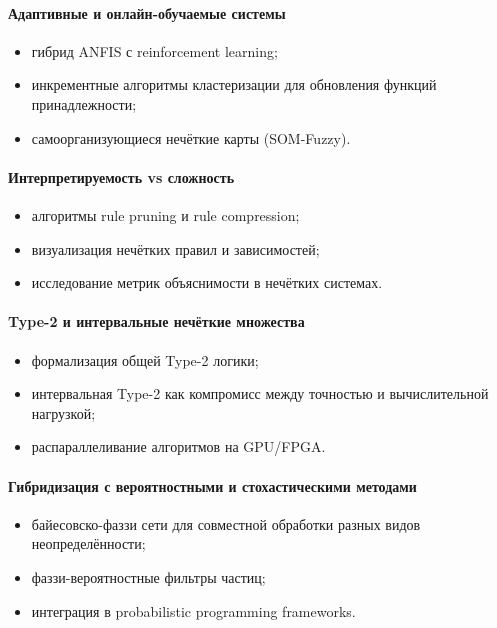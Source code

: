 \paragraph{Адаптивные и онлайн-обучаемые системы}
\begin{itemize}
  \item гибрид ANFIS с reinforcement learning;
  \item инкрементные алгоритмы кластеризации для обновления функций принадлежности;
  \item самоорганизующиеся нечёткие карты (SOM-Fuzzy).
\end{itemize}

\paragraph{Интерпретируемость vs сложность}
\begin{itemize}
  \item алгоритмы rule pruning и rule compression;
  \item визуализация нечётких правил и зависимостей;
  \item исследование метрик объяснимости в нечётких системах.
\end{itemize}

\paragraph{Type-2 и интервальные нечёткие множества}
\begin{itemize}
  \item формализация общей Type-2 логики;
  \item интервальная Type-2 как компромисс между точностью и вычислительной нагрузкой;
  \item распараллеливание алгоритмов на GPU/FPGA.
\end{itemize}

\paragraph{Гибридизация с вероятностными и стохастическими методами}
\begin{itemize}
  \item байесовско-фаззи сети для совместной обработки разных видов неопределённости;
  \item фаззи-вероятностные фильтры частиц;
  \item интеграция в probabilistic programming frameworks.
\end{itemize}


